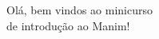 \documentclass[preview]{standalone}
\begin{document}
\begin{center}
Olá, bem vindos ao minicurso \\ de introdução ao Manim!
\end{center}
\end{document}
